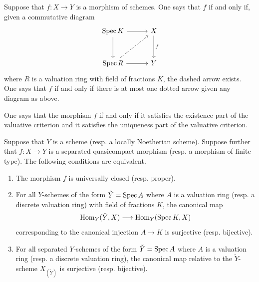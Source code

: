 \documentclass [11 pt, oneside] {article}
\begin{document}
\begin{definition}\label{}\text{}
Suppose that $f:X\longrightarrow Y$ is a morphism of schemes. One says that $f$  if and only if, given a commutative diagram
\[
\begin{tikzcd}[row sep = 3 em, column sep = 3 em]
	\Spec K \ar[r]\ar[d] &X\ar[d, "f"]\\ \Spec R \ar[r]\ar[ur,dashed] & Y
\end{tikzcd}
\]
where $R$ is a valuation ring with field of fractions $K$, the dashed arrow exists. One says that $f$  if and only if there is at most one dotted arrow given any diagram as above.

One says that the morphism $f$  if and only if it satisfies the existence part of the valuative criterion and it satisfies the uniqueness part of the valuative criterion.
\end{definition}

\begin{theorem}\label{}\index{}\text{}
Suppose that $Y$ is a scheme (resp. a locally Noetherian scheme). Suppose further that $f:X\longrightarrow Y$ is a separated quasicompact morphism (resp. a morphism of finite type). The following conditions are equivalent.
 \begin{enumerate}
	\item The morphism $f$ is universally closed (resp. proper).
	\item For all $Y$-schemes of the form $\tilde Y = \operatorname{Spec} A$ where $A$ is a valuation ring (resp. a discrete valuation ring) with field of fractions $K$, the canonical map
		\begin{align*}
			\operatorname{Hom}_{Y}(\tilde Y, X)\longrightarrow \operatorname{Hom}_{Y}(\operatorname{Spec} K, X)
		\end{align*}
		corresponding to the canonical injection $A\longrightarrow K$ is surjective (resp. bijective).
	\item For all separated $Y$-schemes of the form $\tilde Y = \operatorname{Spec} A$ where $A$ is a valuation ring (resp. a discrete valuation ring), the canonical map relative to the $\tilde Y$-scheme $X_{(\tilde Y) }$ is surjective (resp. bijective).
\end{enumerate}
\end{theorem}
\end{document}
